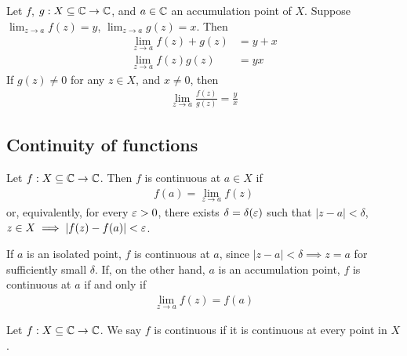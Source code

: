 \documentclass{../template/note}
\begin{document}
    \begin{lemma}
        Let \(f\), \(g: X \subseteq \mathbb C \to \mathbb C\), and \(a \in \mathbb C\) an accumulation point of \(X\). Suppose \(\lim_{z \to a}f(z) = y\), \(\lim_{z \to a}g(z) = x\). Then
        \begin{align*}
            \lim_{z \to a} f(z) + g(z) &= y + x \\
            \lim_{z \to a} f(z)g(z) &= yx
        \end{align*}
        If \(g(z) \neq 0\) for any \(z \in X\), and \(x \neq 0\), then
        \begin{align*}
            \lim_{z \to a} \frac{f(z)}{g(z)} = \frac{y}{x}
        \end{align*}
    \end{lemma}
    
    \subsection{Continuity of functions}

    \begin{definition}
        Let \(f: X \subseteq \mathbb C \to \mathbb C\). Then \(f\) is continuous at \(a \in X\) if
        \begin{align*}
            f(a) = \lim_{z \to a}f(z)
        \end{align*}
        or, equivalently, for every \(\varepsilon > 0\), there exists \(\delta = \delta(\varepsilon)\) such that \(|z-a| < \delta\), \(z \in X \implies |f(z)-f(a)| < \varepsilon\).        
    \end{definition}

    If \(a\) is an isolated point, \(f\) is continuous at \(a\), since \(|z-a| < \delta \implies z = a\) for sufficiently small \(\delta\). If, on the other hand, \(a\) is an accumulation point, \(f\) is continuous at \(a\) if and only if
    \begin{align*}
        \lim_{z \to a} f(z) = f(a)
    \end{align*}
    

    \begin{definition}
        Let \(f: X \subseteq \mathbb C \to \mathbb C\). We say \(f\) is continuous if it is continuous at every point in \(X\).
    \end{definition}
\end{document}
